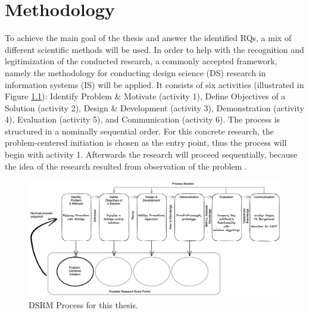\chapter{Methodology}


To achieve the main goal of the thesis and answer the identified RQs,
a mix of different scientific methods will be used.
In order to help with the recognition and legitimization of the conducted research,
a commonly accepted framework, namely
the methodology for conducting design science (DS) research
in information systems (IS)
\autocite{designScienceResearchMethodologyForInformationSystemsResearch}
will be applied.
It consists of six activities
(illustrated in Figure \ref{fig:dsrmProcessReleasePromotionGitOps}):
Identify Problem \& Motivate (activity 1),
Define Objectives of a Solution (activity 2),
Design \& Development (activity 3),
Demonstration (activity 4),
Evaluation (activity 5),
and
Communication (activity 6).
The process is structured in a nominally sequential order.
For this concrete research,
the problem-centered initiation is chosen as the entry point,
thus the process will begin with activity 1.
Afterwards the research will proceed sequentially,
because the idea of the research resulted from observation of the problem
\autocite{designScienceResearchMethodologyForInformationSystemsResearch}.
\bigskip

\begin{figure}[h]
	\centering
	\includegraphics[width=1.00\linewidth]{figures/dsrm-process-release-promotion-gitops.png}
	\caption{DSRM Process for this thesis.
	}
	\label{fig:dsrmProcessReleasePromotionGitOps}	
\end{figure}

